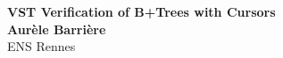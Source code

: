 \documentclass[a0,landscape]{a0poster}
\begin{document}


\begin{minipage}[b]{0.55\linewidth}
\veryHuge \color{NavyBlue} \textbf{VST Verification of B+Trees with Cursors} \color{Black}\\ %
\huge \textbf{Aur\`ele Barri\`ere}\\ %
\huge ENS Rennes\\ %
\end{minipage}
%
%

\vspace{1cm} %

\end{document}
